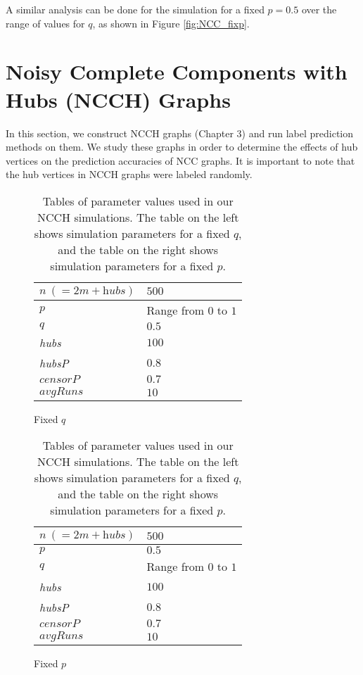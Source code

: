 A similar analysis can be done for the simulation for a fixed $p=0.5$ over
the range of values for $q$, as shown in Figure \ref{fig:NCC_fixp}.


\section{Noisy Complete Components with Hubs (NCCH) Graphs}
In this section, we construct NCCH graphs (Chapter 3) and run label 
prediction methods on them. We study these graphs in order to determine the
effects of hub vertices on the prediction accuracies of NCC graphs. It is
important to note that the hub vertices in NCCH graphs were labeled 
randomly.

\begin{table}[H]
\centering
\begin{subfigure}[h]{0.4\linewidth}
\begin{tabular}{|l|l|}
\hline
$n ~(= 2m + \textit{hubs})$ & $500$ \\ \hline
$p$ & Range from $0$ to $1$\\ \hline
$q$ & $0.5$\\ \hline
\textit{hubs} & $100$\\ \hline
\textit{hubsP} & $0.8$\\ \hline
$censorP$ & $0.7$\\ \hline
$avgRuns$ & $10$\\ \hline
\end{tabular}
\caption{Fixed $q$}
\end{subfigure}
\hfill
\begin{subfigure}[h]{0.4\linewidth}
\begin{tabular}{|l|l|}
\hline
$n ~(= 2m + \textit{hubs})$ & $500$ \\ \hline
$p$ & $0.5$\\ \hline
$q$ & Range from $0$ to $1$\\ \hline
\textit{hubs} & $100$\\ \hline
\textit{hubsP} & $0.8$\\ \hline
$censorP$ & $0.7$\\ \hline
$avgRuns$ & $10$\\ \hline
\end{tabular}
\caption{Fixed $p$}
\end{subfigure}%
\caption{Tables of parameter values used in our NCCH simulations. The table
on the left shows simulation parameters for a fixed $q$, and the table on
the right shows simulation parameters for a fixed $p$.}
\label{table:NCCH-params}
\end{table}

